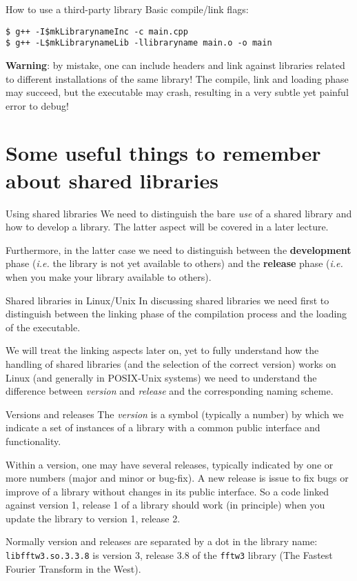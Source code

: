 \documentclass[10pt]{beamer}
\begin{document}
\begin{frame}[fragile]{How to use a third-party library}
Basic compile/link flags:
\begin{verbatim}
$ g++ -I$mkLibrarynameInc -c main.cpp
$ g++ -L$mkLibrarynameLib -llibraryname main.o -o main
\end{verbatim}
\bigskip
\textbf{Warning}: by mistake, one can include headers and link against libraries related to different installations of the same library! The compile, link and loading phase may succeed, but the executable may crash, resulting in a very subtle yet painful error to debug!
\end{frame}

\section{Some useful things to remember about shared libraries}

\begin{frame}{Using shared libraries}
We need to distinguish the bare \emph{use} of a shared library and how
to develop a library. The latter aspect will be covered in a later lecture.
\medskip

Furthermore, in the latter case we need to distinguish between the
\textbf{development} phase (\textit{i.e.} the library is not yet available to others) and the \textbf{release} phase (\textit{i.e.} when you make your
library available to others).
\end{frame}


\begin{frame}{Shared libraries in Linux/Unix} In
discussing shared libraries we need first to distinguish between the
linking phase of the compilation process and the loading of the
executable. 
\medskip

We will treat the linking aspects later on, yet to fully understand
how the handling of shared libraries (and the selection of the correct
version) works on Linux (and generally in POSIX-Unix systems) we need
to understand the difference between \emph{version} and \emph{release}
and the corresponding naming scheme.
\end{frame}

\begin{frame}{Versions and releases} 
The \emph{version} is a symbol
(typically a number) by which we indicate a set of instances of a
library with a common public interface and functionality.
\smallskip

Within a version, one may have several releases, typically indicated
by one or more numbers (major and minor or bug-fix). A new release is 
issue to fix bugs  or improve of a library without
changes in its public interface. So a code linked against version 1,
release 1 of a library should work (in principle) when you update
the library to version 1, release 2.
\smallskip

Normally version and releases are separated by a dot in the library name:
\texttt{libfftw3.so.3.3.8} is version 3, release 3.8 of the
\texttt{fftw3} library (The Fastest Fourier Transform in the West).
\end{frame}
\end{document}
